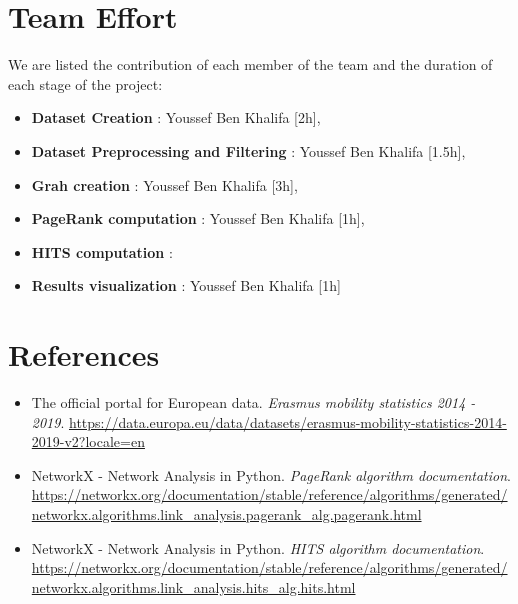     \section{Team Effort}
    We are listed the contribution of each member of the team and the duration of each stage of the project:
    \begin{itemize}
      \item \textbf{Dataset Creation} : Youssef Ben Khalifa [2h], 
      \item \textbf{Dataset Preprocessing and Filtering} : Youssef Ben Khalifa [1.5h], 
      \item \textbf{Grah creation} : Youssef Ben Khalifa [3h],
      \item \textbf{PageRank computation} : Youssef Ben Khalifa [1h],
      \item \textbf{HITS computation} : 
      \item \textbf{Results visualization} : Youssef Ben Khalifa [1h]
    \end{itemize}
  \section{References}
    \begin{itemize}
        \item The official portal for European data. \textit{Erasmus mobility statistics 2014 - 2019}. \url{https://data.europa.eu/data/datasets/erasmus-mobility-statistics-2014-2019-v2?locale=en} 
        \item NetworkX - Network Analysis in Python. \textit{PageRank algorithm documentation}. \url{https://networkx.org/documentation/stable/reference/algorithms/generated/networkx.algorithms.link_analysis.pagerank_alg.pagerank.html}
        \item NetworkX - Network Analysis in Python. \textit{HITS algorithm documentation}. \url{https://networkx.org/documentation/stable/reference/algorithms/generated/networkx.algorithms.link_analysis.hits_alg.hits.html}
    \end{itemize}
    